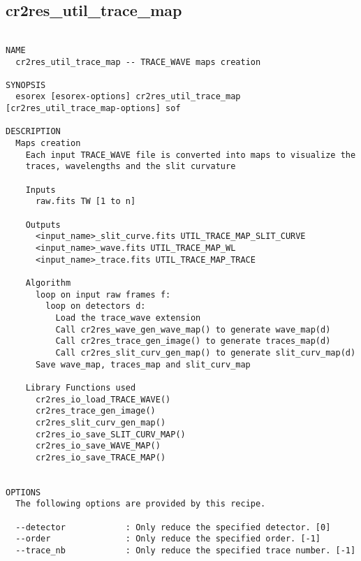 \subsection{cr2res\_util\_trace\_map}
\begin{verbatim}

NAME
  cr2res_util_trace_map -- TRACE_WAVE maps creation

SYNOPSIS
  esorex [esorex-options] cr2res_util_trace_map [cr2res_util_trace_map-options] sof

DESCRIPTION
  Maps creation                                                           
    Each input TRACE_WAVE file is converted into maps to visualize the    
    traces, wavelengths and the slit curvature                            
                                                                          
    Inputs                                                                
      raw.fits TW [1 to n]                             
                                                                          
    Outputs                                                               
      <input_name>_slit_curve.fits UTIL_TRACE_MAP_SLIT_CURVE
      <input_name>_wave.fits UTIL_TRACE_MAP_WL
      <input_name>_trace.fits UTIL_TRACE_MAP_TRACE
                                                                          
    Algorithm                                                             
      loop on input raw frames f:                                         
        loop on detectors d:                                              
          Load the trace_wave extension                                   
          Call cr2res_wave_gen_wave_map() to generate wave_map(d)         
          Call cr2res_trace_gen_image() to generate traces_map(d)         
          Call cr2res_slit_curv_gen_map() to generate slit_curv_map(d)    
      Save wave_map, traces_map and slit_curv_map                         
                                                                          
    Library Functions used                                                
      cr2res_io_load_TRACE_WAVE()                                         
      cr2res_trace_gen_image()                                            
      cr2res_slit_curv_gen_map()                                          
      cr2res_io_save_SLIT_CURV_MAP()                                      
      cr2res_io_save_WAVE_MAP()                                           
      cr2res_io_save_TRACE_MAP()                                          
  

OPTIONS
  The following options are provided by this recipe.

  --detector            : Only reduce the specified detector. [0]
  --order               : Only reduce the specified order. [-1]
  --trace_nb            : Only reduce the specified trace number. [-1]

\end{verbatim}
